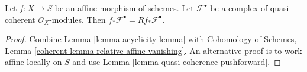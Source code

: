 \begin{lemma}
\label{lemma-pushforward-affine-morphism}
Let $f : X \to S$ be an affine morphism of schemes. Let $\mathcal{F}^\bullet$
be a complex of quasi-coherent $\mathcal{O}_X$-modules. Then
$f_*\mathcal{F}^\bullet = Rf_*\mathcal{F}^\bullet$.
\end{lemma}

\begin{proof}
Combine Lemma \ref{lemma-acyclicity-lemma} with
Cohomology of Schemes, Lemma \ref{coherent-lemma-relative-affine-vanishing}.
An alternative proof is to work affine locally on $S$
and use Lemma \ref{lemma-quasi-coherence-pushforward}.
\end{proof}

